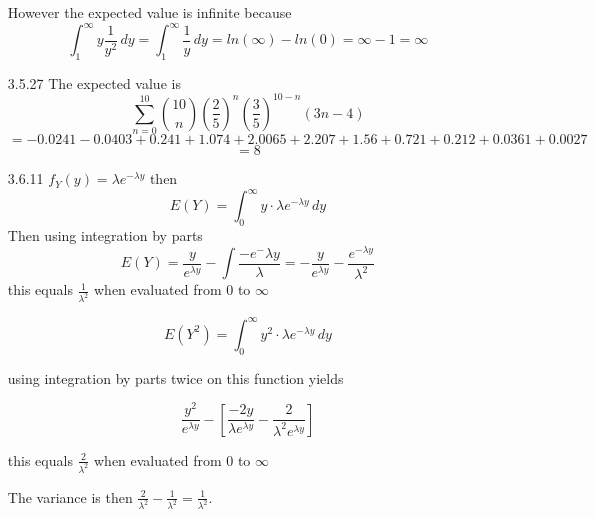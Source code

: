 \documentclass[11pt,fleqn]{article}
\begin{document}
\begin{enumerate}
However the expected value is infinite because 
\[
\int_1^\infty y\frac{1}{y^2} \,dy = \int_1^\infty \frac{1}{y} \,dy = ln(\infty)
- ln(0) = \infty-1 = \infty
\]
\item[3.5.27]
The expected value is 
\[
\sum_{n=0}^{10}{10 \choose
n}\left(\frac{2}{5}\right)^n\left(\frac{3}{5}\right)^{10-n}(3n-4)  
\]
\[
= -0.0241
-0.0403 + 0.241 + 1.074 + 2.0065 +2.207+1.56+0.721+0.212 +0.0361 +0.0027 
\]
\[
=8
\]
\item[3.6.11]
$f_Y(y) = \lambda e^{-\lambda y}$ then 
\[
E(Y) = \int_0^\infty y \cdot \lambda e^{-\lambda y} \,dy 
\]
Then using integration by parts 
\[
E(Y) = \frac{y}{e^{\lambda y}} - \int \frac{-e^-\lambda y}{\lambda} = 
-\frac{y}{e^{\lambda y}} - \frac{e^{-\lambda y}}{\lambda^2}
\]
this equals $ \frac{1}{\lambda^2}$ when evaluated from $0$ to $\infty$

\[
E(Y^2) = \int_0^\infty y^2 \cdot \lambda e^{-\lambda y} \,dy
\] 

using integration by parts twice on this function yields 

\[
\frac{y^2}{e^{\lambda y}} - \left[ \frac{-2y}{\lambda e^{\lambda y}} - 
\frac{2}{\lambda^2 e^{\lambda y}} \right]
\]

this equals $ \frac{2}{\lambda^2}$ when evaluated from $0$ to $\infty$

The variance is then $ \frac{2}{\lambda^2} -  \frac{1}{\lambda^2} = 
\frac{1}{\lambda^2}$.
\end{enumerate}
\end{document}

